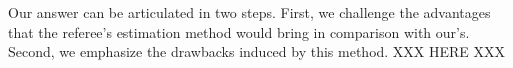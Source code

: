 \documentclass[a4paper,12pt]{article}
\begin{document}
Our answer can be articulated in two steps. First, we challenge the advantages that the referee's estimation method would bring in comparison with our's. Second, we emphasize the drawbacks induced by this method. XXX HERE XXX

%
%
%
%
%
%
\end{document}
